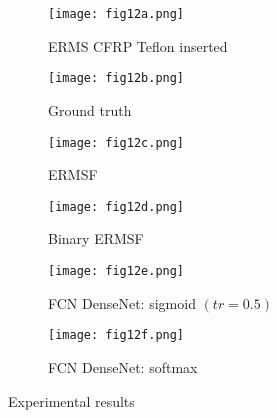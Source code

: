 	\begin{figure} [!h]
		\centering
		\begin{subfigure}[b]{0.47\textwidth}
			\centering
			\texttt{[image: fig12a.png]}
			\caption{ERMS CFRP Teflon inserted}
			\label{fig:Delamination}
		\end{subfigure}			
		\hfill
		\begin{subfigure}[b]{0.47\textwidth}
			\centering 	
			\texttt{[image: fig12b.png]}
			\caption{Ground truth} 
			\label{fig:damage_label}
		\end{subfigure}
		\hfill
		\begin{subfigure}[b]{0.47\textwidth}
			\centering
			\texttt{[image: fig12c.png]}
			\caption{ERMSF} 
			\label{fig:ERMSF_CFRP_teflon}
		\end{subfigure}
		\hfill
		\begin{subfigure}[b]{0.47\textwidth}
		\centering
		\texttt{[image: fig12d.png]}
		\caption{Binary ERMSF} 
		\label{fig:Binary_ERMSF_CFRP}
		\end{subfigure}
		\hfill
		\begin{subfigure}[b]{0.47\textwidth}
			\centering
			\texttt{[image: fig12e.png]}
			\caption{FCN DenseNet: sigmoid \((tr = 0.5)\)} 
			\label{fig:EXP_predict_sigmoid}
		\end{subfigure}
		\hfill
		\begin{subfigure}[b]{0.47\textwidth}
			\centering
			\texttt{[image: fig12f.png]}
			\caption{FCN DenseNet: softmax} 
			\label{fig:EXP_predict_softmax}
		\end{subfigure}
			\caption{Experimental results}
			\label{fig:Exp_ERMS_teflon}
		\end{figure}
